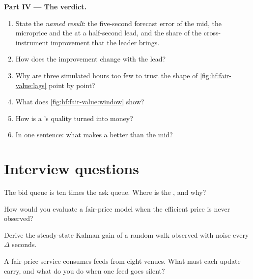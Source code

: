 \begin{problem}
\medskip\noindent\textbf{Part IV --- The verdict.}
\begin{enumerate}[resume]
\item State the \emph{named result}: the five-second forecast error of the mid, the microprice and the  at a
half-second lead, and the share of the cross-instrument improvement that the leader brings.
\item How does the improvement change with the lead?
\item Why are three simulated hours too few to trust the shape of \cref{fig:hf:fair-value:lags} point by point?
\item What does \cref{fig:hf:fair-value:window} show?
\item How is a 's quality turned into money?
\item In one sentence: what makes a  better than the mid?
\end{enumerate}
\end{problem}

\section{Interview questions}

\begin{interviewq}\label{iq:hf:fair-value:1}
The bid queue is ten times the ask queue. Where is the , and why?
\end{interviewq}

\begin{interviewq}\label{iq:hf:fair-value:2}
How would you evaluate a fair-price model when the efficient price is never observed?
\end{interviewq}

\begin{interviewq}\label{iq:hf:fair-value:3}
Derive the steady-state Kalman gain of a random walk observed with noise every $\Delta$ seconds.
\end{interviewq}

\begin{interviewq}\label{iq:hf:fair-value:4}
A fair-price service consumes feeds from eight venues. What must each update carry, and what do you do when one feed goes silent?
\end{interviewq}

